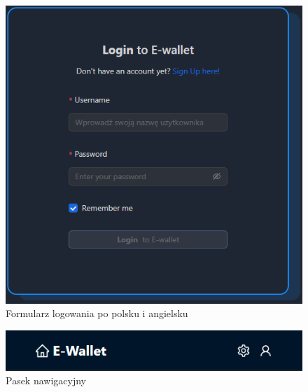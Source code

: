 \begin{figure}[H]
\begin{minipage}{0.5\textwidth}
	\includegraphics[width=\linewidth]{images/LoginAng}
\end{minipage}
	\caption{Formularz logowania po polsku i angielsku}
	\label{fig:login}
\end{figure}
\begin{figure}[H]
	\centering
	\includegraphics[width=0.6\linewidth]{images/Navbar}
	\caption{Pasek nawigacyjny}
	\label{fig:navbar}
\end{figure}

